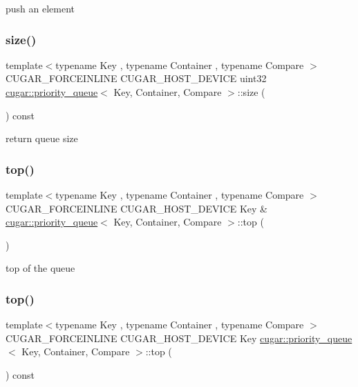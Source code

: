 push an element \mbox{\label{structcugar_1_1priority__queue_aa75b22d30695f86f47dba642f44a4774}} 
\subsubsection{\texorpdfstring{size()}{size()}}
{\footnotesize\ttfamily template$<$typename Key , typename Container , typename Compare $>$ \\
C\+U\+G\+A\+R\+\_\+\+F\+O\+R\+C\+E\+I\+N\+L\+I\+NE C\+U\+G\+A\+R\+\_\+\+H\+O\+S\+T\+\_\+\+D\+E\+V\+I\+CE uint32 \hyperlink{structcugar_1_1priority__queue}{cugar\+::priority\+\_\+queue}$<$ Key, Container, Compare $>$\+::size (\begin{DoxyParamCaption}{ }\end{DoxyParamCaption}) const}

return queue size \mbox{\label{structcugar_1_1priority__queue_ae74971b0d5b9ed6d0822601ba8afc875}} 
\subsubsection{\texorpdfstring{top()}{top()}\hspace{0.1cm}{\footnotesize\ttfamily [1/2]}}
{\footnotesize\ttfamily template$<$typename Key , typename Container , typename Compare $>$ \\
C\+U\+G\+A\+R\+\_\+\+F\+O\+R\+C\+E\+I\+N\+L\+I\+NE C\+U\+G\+A\+R\+\_\+\+H\+O\+S\+T\+\_\+\+D\+E\+V\+I\+CE Key \& \hyperlink{structcugar_1_1priority__queue}{cugar\+::priority\+\_\+queue}$<$ Key, Container, Compare $>$\+::top (\begin{DoxyParamCaption}{ }\end{DoxyParamCaption})}

top of the queue \mbox{\label{structcugar_1_1priority__queue_a1c4ec8611f6fe2e6dbfdae408435b9cd}} 
\subsubsection{\texorpdfstring{top()}{top()}\hspace{0.1cm}{\footnotesize\ttfamily [2/2]}}
{\footnotesize\ttfamily template$<$typename Key , typename Container , typename Compare $>$ \\
C\+U\+G\+A\+R\+\_\+\+F\+O\+R\+C\+E\+I\+N\+L\+I\+NE C\+U\+G\+A\+R\+\_\+\+H\+O\+S\+T\+\_\+\+D\+E\+V\+I\+CE Key \hyperlink{structcugar_1_1priority__queue}{cugar\+::priority\+\_\+queue}$<$ Key, Container, Compare $>$\+::top (\begin{DoxyParamCaption}{ }\end{DoxyParamCaption}) const}

